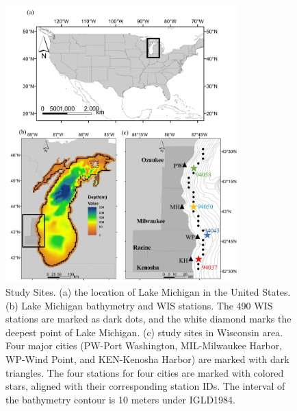 \begin{figure}[htbp]
  \centering
  \includegraphics[width=0.8\textwidth]{chapter3/resources/figure3-1.jpg}
  \caption{Study Sites. (a) the location of Lake Michigan in the United States. (b) Lake Michigan bathymetry and WIS stations. The 490 WIS stations are marked as dark dots, and the white diamond marks the deepest point of Lake Michigan. (c) study sites in Wisconsin area. Four major cities (PW-Port Washington, MIL-Milwaukee Harbor, WP-Wind Point, and KEN-Kenosha Harbor) are marked with dark triangles. The four stations for four cities are marked with colored stars, aligned with their corresponding station IDs. The interval of the bathymetry contour is 10 meters under IGLD1984. }
  \label{fig:fig3.1}
\end{figure}

